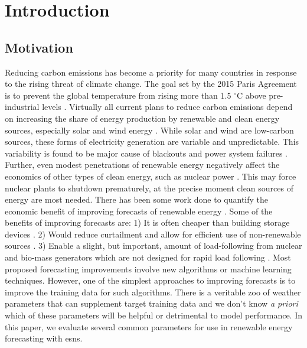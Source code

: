 \section{Introduction}
\subsection{Motivation}
Reducing carbon emissions has become a priority for many countries in response
to the rising threat of climate change. The goal set by the 2015 Paris
Agreement is to prevent the global temperature from rising more than 1.5
$^\circ$C above pre-industrial levels \cite{noauthor_paris_nodate}. Virtually
all current plans to reduce carbon emissions depend on increasing the share of
energy production by renewable and clean energy sources, especially solar and
wind energy \cite{cany_nuclear_2018, chilvers_realising_2017,99th_general_assembly_illinois_2016,isee_illinois_2015}.
 While solar and wind are low-carbon sources, these
forms of electricity generation are variable and unpredictable. This variability
is found to be major cause of blackouts and power system failures
\cite{haes_alhelou_survey_2019}. Further, even modest penetrations of renewable
energy negatively affect the economics of other types of clean energy, such as
nuclear power
\cite{cany_nuclear_2018,keppler_carbon_2011,illinois_commerce_commision_icc_potential_2015}. This may force nuclear plants to shutdown prematurely, at the
precise moment clean sources of energy are most needed. There has been
some work done to quantify the economic benefit of improving forecasts of
renewable energy \cite{wang_quantifying_2016, mc_garrigle_quantifying_2015, brancucci_martinez-anido_value_2016}. Some of the benefits of improving
forecasts are: 1) It is often cheaper than building storage devices
\cite{wang_quantifying_2016}. 2) Would reduce curtailment and allow for
efficient use of non-renewable sources \cite{mc_garrigle_quantifying_2015}.
3) Enable a slight, but important, amount of load-following from nuclear and
bio-mass generators which are not designed for rapid load following
\cite{brancucci_martinez-anido_value_2016}. Most proposed forecasting
improvements involve new algorithms or machine learning techniques. However,
one of the simplest approaches to improving forecasts is to improve the
training data for such algorithms. There is a veritable zoo of weather
parameters that can supplement target training data and we don't know \textit{a
priori} which of these parameters will be helpful or detrimental to model
performance. In this paper, we evaluate several common parameters for use
in renewable energy forecasting with \glspl{esn}.
